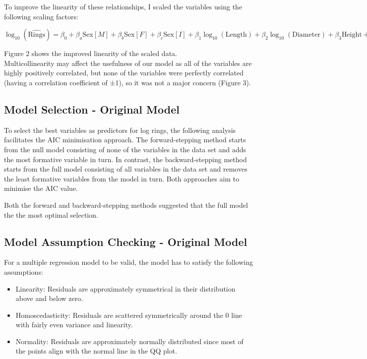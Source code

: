 \documentclass[a4paper,9pt,twocolumn,twoside,]{pinp}
\providecommand{\tightlist}{%
  \setlength{\itemsep}{0pt}\setlength{\parskip}{0pt}}
\begin{document}
To improve the linearity of these relationships, I scaled the variables
using the following scaling factors:

\(\log_{10}(\widehat{\text{Rings}}) = \beta_0 + \beta_a\text{Sex}[M] + \beta_b\text{Sex} [F] + \beta_c\text{Sex}[I] + \beta_1\log_{10}(\text{Length}) + \beta_2\log_{10}(\text{Diameter}) + \beta_3\text{Height} + \beta_4\log_{10}(\text{Whole Weight}) + \beta_5\log_{10}(\text{Shucked Weight}) + \beta_6\log_{10}(\text{Viscera Weight}) + \beta_7\log_{10}(\text{Shell Weight}) + \varepsilon_i\)

Figure 2 shows the improved linearity of the scaled data.\\

Multicollinearity may affect the usefulness of our model as all of the
variables are highly positively correlated, but none of the variables
were perfectly correlated (having a correlation coefficient of ±1), so
it was not a major concern (Figure 3).

\hypertarget{model-selection---original-model}{%
\subsection{Model Selection - Original
Model}\label{model-selection---original-model}}

To select the best variables as predictors for log rings, the following
analysis facilitates the AIC minimisation approach. The forward-stepping
method starts from the null model consisting of none of the variables in
the data set and adds the most formative variable in turn. In contrast,
the backward-stepping method starts from the full model consisting of
all variables in the data set and removes the least formative variables
from the model in turn. Both approaches aim to minimise the AIC value.

Both the forward and backward-stepping methods suggested that the full
model the the most optimal selection.

\hypertarget{model-assumption-checking---original-model}{%
\subsection{Model Assumption Checking - Original
Model}\label{model-assumption-checking---original-model}}

For a multiple regression model to be valid, the model has to satisfy
the following assumptions:

\begin{itemize}
\tightlist
\item
  Linearity: Residuals are approximately symmetrical in their
  distribution above and below zero.
\item
  Homoscedasticity: Residuals are scattered symmetrically around the 0
  line with fairly even variance and linearity.
\item
  Normality: Residuals are approximately normally distributed since most
  of the points align with the normal line in the QQ plot.
\end{itemize}
\end{document}
